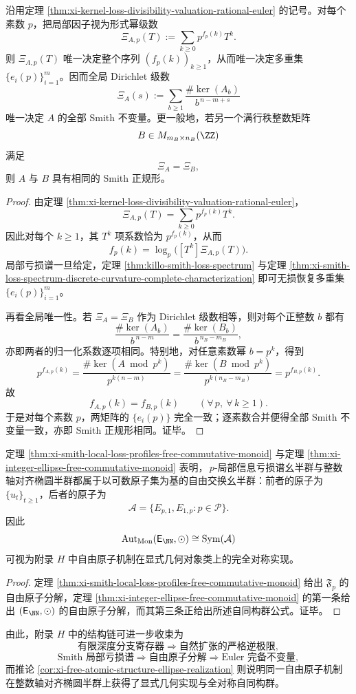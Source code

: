 \begin{theorem}\label{thm:xi-smith-local-euler-complete-invariant}
沿用定理 \ref{thm:xi-kernel-loss-divisibility-valuation-rational-euler} 的记号。对每个素数 \(p\)，把局部因子视为形式幂级数
\[
\Xi_{A,p}(T)
:=
\sum_{k\ge 0}p^{f_p(k)}T^k.
\]
则 \(\Xi_{A,p}(T)\) 唯一决定整个序列 \((f_p(k))_{k\ge 1}\)，从而唯一决定多重集 \(\{e_i(p)\}_{i=1}^{m}\)。因而全局 Dirichlet 级数
\[
\Xi_A(s)
:=
\sum_{b\ge 1}\frac{\#\ker(A_b)}{b^{\,n-m+s}}
\]
唯一决定 \(A\) 的全部 Smith 不变量。更一般地，若另一个满行秩整数矩阵
\[
B\in M_{m_B\times n_B}(\ZZ)
\]
满足
\[
\Xi_A=\Xi_B,
\]
则 \(A\) 与 \(B\) 具有相同的 Smith 正规形。
\end{theorem}
\begin{proof}
由定理 \ref{thm:xi-kernel-loss-divisibility-valuation-rational-euler}，
\[
\Xi_{A,p}(T)=\sum_{k\ge 0}p^{f_p(k)}T^k.
\]
因此对每个 \(k\ge 1\)，其 \(T^k\) 项系数恰为 \(p^{f_p(k)}\)，从而
\[
f_p(k)=\log_p\!\bigl([T^k]\Xi_{A,p}(T)\bigr).
\]
局部亏损谱一旦给定，定理 \ref{thm:killo-smith-loss-spectrum} 与定理 \ref{thm:xi-smith-loss-spectrum-discrete-curvature-complete-characterization} 即可无损恢复多重集 \(\{e_i(p)\}_{i=1}^{m}\)。

再看全局唯一性。若 \(\Xi_A=\Xi_B\) 作为 Dirichlet 级数相等，则对每个正整数 \(b\) 都有
\[
\frac{\#\ker(A_b)}{b^{\,n-m}}
=
\frac{\#\ker(B_b)}{b^{\,n_B-m_B}},
\]
亦即两者的归一化系数逐项相同。特别地，对任意素数幂 \(b=p^k\)，得到
\[
p^{f_{A,p}(k)}
=
\frac{\#\ker(A\bmod p^k)}{p^{k(n-m)}}
=
\frac{\#\ker(B\bmod p^k)}{p^{k(n_B-m_B)}}
=
p^{f_{B,p}(k)}.
\]
故
\[
f_{A,p}(k)=f_{B,p}(k)\qquad(\forall\,p,\ \forall\,k\ge 1).
\]
于是对每个素数 \(p\)，两矩阵的 \(\{e_i(p)\}\) 完全一致；逐素数合并便得全部 Smith 不变量一致，亦即 Smith 正规形相同。证毕。
\end{proof}

\begin{corollary}[自由原子结构在整数轴对齐椭圆半群中的几何实现]\label{cor:xi-free-atomic-structure-ellipse-realization}
定理 \ref{thm:xi-smith-local-loss-profiles-free-commutative-monoid} 与定理 \ref{thm:xi-integer-ellipse-free-commutative-monoid} 表明，\(\,p\)-局部信息亏损谱幺半群与整数轴对齐椭圆半群都属于以可数原子集为基的自由交换幺半群：前者的原子为 \(\{u_t\}_{t\ge 1}\)，后者的原子为
\[
\mathcal A=\{E_{p,1},E_{1,p}:p\in\mathcal P\}.
\]
因此
\[
\operatorname{Aut}_{\mathrm{Mon}}(\mathsf E_{\NN},\odot)\cong \mathrm{Sym}(\mathcal A)
\]
可视为附录 \(H\) 中自由原子机制在显式几何对象类上的完全对称实现。
\end{corollary}
\begin{proof}
定理 \ref{thm:xi-smith-local-loss-profiles-free-commutative-monoid} 给出 \(\mathfrak F_p\) 的自由原子分解，定理 \ref{thm:xi-integer-ellipse-free-commutative-monoid} 的第一条给出 \((\mathsf E_{\NN},\odot)\) 的自由原子分解，而其第三条正给出所述自同构群公式。证毕。
\end{proof}

\noindent
由此，附录 \(H\) 中的结构链可进一步收束为
\[
\text{有限深度分支寄存器}
\Longrightarrow
\text{自然扩张的严格逆极限},
\]
\[
\text{Smith 局部亏损谱}
\Longrightarrow
\text{自由原子分解}
\Longrightarrow
\text{Euler 完备不变量},
\]
而推论 \ref{cor:xi-free-atomic-structure-ellipse-realization} 则说明同一自由原子机制在整数轴对齐椭圆半群上获得了显式几何实现与全对称自同构群。

\endinput
